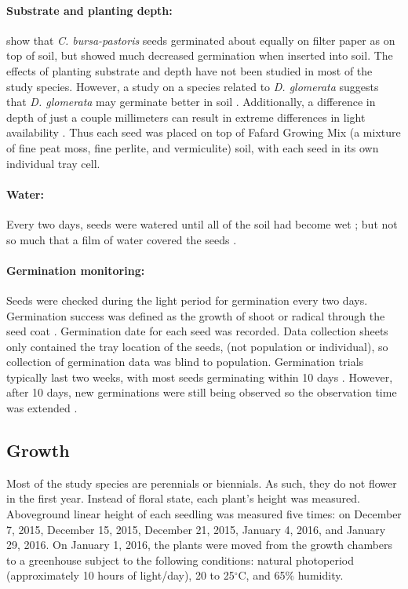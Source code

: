 \documentclass[12pt]{article}\usepackage[]{graphicx}\usepackage[]{color}
\begin{document}
	\paragraph{Substrate and planting depth:} \textcite{Popay1970} show that \textit{C. bursa-pastoris} seeds germinated about equally on filter paper as on top of soil, but showed much decreased germination when inserted into soil. The effects of planting substrate and depth have not been studied in most of the study species. However, a study on a species related to \textit{D. glomerata} suggests that \textit{D. glomerata} may germinate better in soil \parencite{Andrews1974}. Additionally, a difference in depth of just a couple millimeters can result in extreme differences in light availability \parencite{Tester1987}. Thus each seed was placed on top of Fafard Growing Mix (a mixture of fine peat moss, fine perlite, and vermiculite) soil, with each seed in its own individual tray cell.
	
	\paragraph{Water:} Every two days, seeds were watered until all of the soil had become wet \parencite{Steinbauer1957}; but not so much that a film of water covered the seeds \parencite{AOSA1960}.
	
	\paragraph{Germination monitoring:} Seeds were checked during the light period for germination every two days. Germination success was defined as the growth of shoot or radical through the seed coat \parencite{Baskin1998,Popay1970}. Germination date for each seed was recorded. Data collection sheets only contained the tray location of the seeds, (not population or individual), so collection of germination data was blind to population.  Germination trials typically last two weeks, with most seeds germinating within 10 days \parencite{Baskin1998}. However, after 10 days, new germinations were still being observed so the observation time was extended \parencite{Wulff1994}.
	
	\subsection{Growth}
 	Most of the study species are perennials or biennials. As such, they do not flower in the first year. Instead of floral state, each plant's height was measured. Aboveground linear height of each seedling was measured five times: on December 7, 2015, December 15, 2015, December 21, 2015, January 4, 2016, and January 29, 2016. On January 1, 2016, the plants were moved from the growth chambers to a greenhouse subject to the following conditions: natural photoperiod (approximately 10 hours of light/day), 20 to 25$^\circ$C, and 65\% humidity.  
 	
\end{document}
